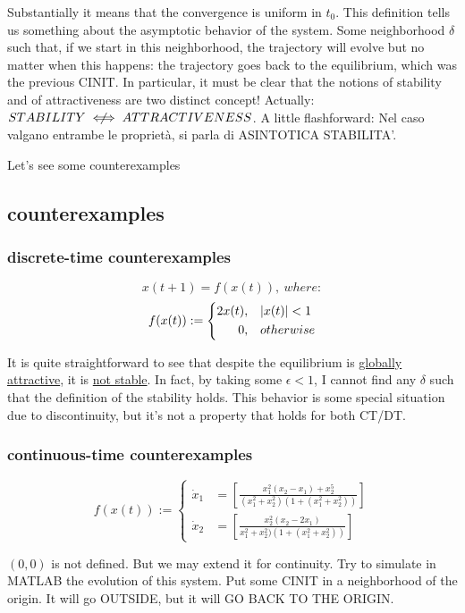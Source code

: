 Substantially it means that the convergence is uniform in $t_0$. This definition tells us something about the asymptotic behavior of the system. Some neighborhood $\delta$ such that, if we start in this neighborhood, the trajectory will evolve but no matter when this happens: the trajectory goes back to the equilibrium, which was the previous CINIT.
In particular, it must be clear that the notions of stability and of attractiveness are two distinct concept! Actually: $STABILITY \centernot{\iff} ATTRACTIVENESS$. A little flashforward: Nel caso valgano entrambe le proprietà, si parla di ASINTOTICA STABILITA'.

Let's see some counterexamples

\subsection{counterexamples}

\subsubsection{discrete-time counterexamples}

\[
	x(t+1) = f(x(t)),\ where:
\]
\[
	f(x(t)) := \left\{
	\begin{aligned}
	2x(t),& \quad \lvert x(t)\rvert < 1 \\
	0,& \quad otherwise
	\end{aligned} 
	\right.
\]

It is quite straightforward to see that despite the equilibrium is \underline{globally attractive}, it is \underline{not stable}. In fact, by taking some $\epsilon < 1$, I cannot find any $\delta$ such that the definition of the stability holds. This behavior is some special situation due to discontinuity, but it's not a property that holds for both CT/DT.

\subsubsection{continuous-time counterexamples}

\[
	f(x(t)) := \left\{
	\begin{aligned}
	\dot{x}_1 &= [\frac{x_1^2(x_2-x_1) + x_2^5}{(x_1^2 + x_2^2)(1+(x_1^2+x_2^2))}] \\
	\dot{x}_2 &= [\frac{x_2^2(x_2-2x_1)}{x_1^2+x_2^2)(1+(x_1^2+x_2^2))}]
	\end{aligned} 
	\right.
\]

$(0,0)$ is not defined. But we may extend it for continuity. Try to simulate in MATLAB the evolution of this system. Put some CINIT in a neighborhood of the origin. It will go OUTSIDE, but it will GO BACK TO THE ORIGIN.

